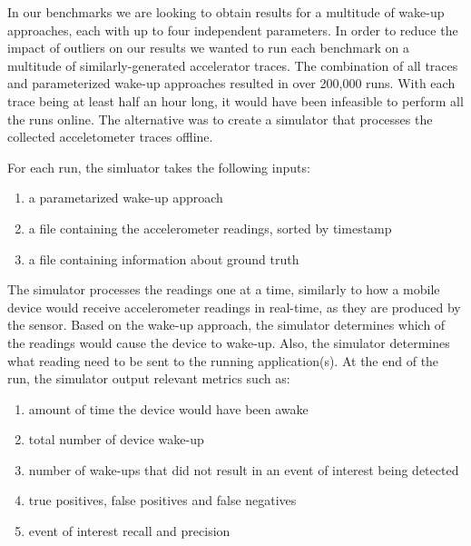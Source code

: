 In our benchmarks we are looking to obtain results for a multitude of wake-up approaches, each with up to four independent parameters. In order to reduce the impact of outliers on our results we wanted to run each benchmark on a multitude of similarly-generated accelerator traces. The combination of all traces and parameterized wake-up approaches resulted in over 200,000 runs. With each trace being at least half an hour long, it would have been infeasible to perform all the runs online. The alternative was to create a simulator that processes the collected acceletometer traces offline. 

For each run, the simluator takes the following inputs:

\begin{enumerate}
\setlength{\itemsep}{-3pt}  

\item a parametarized wake-up approach

\item a file containing the accelerometer readings, sorted by timestamp

\item a file containing information about ground truth

\end{enumerate}

The simulator processes the readings one at a time, similarly to how a mobile device would receive accelerometer readings in real-time, as they are produced by the sensor. Based on the wake-up approach, the simulator determines which of the readings would cause the device to wake-up. Also, the simulator determines what reading need to be sent to the running application(s). At the end of the run, the simulator output relevant metrics such as:

\begin{enumerate}
\setlength{\itemsep}{-3pt}  

\item amount of time the device would have been awake

\item total number of device wake-up

\item number of wake-ups that did not result in an event of interest being detected

\item true positives, false positives and false negatives

\item event of interest recall and precision

\end{enumerate}

